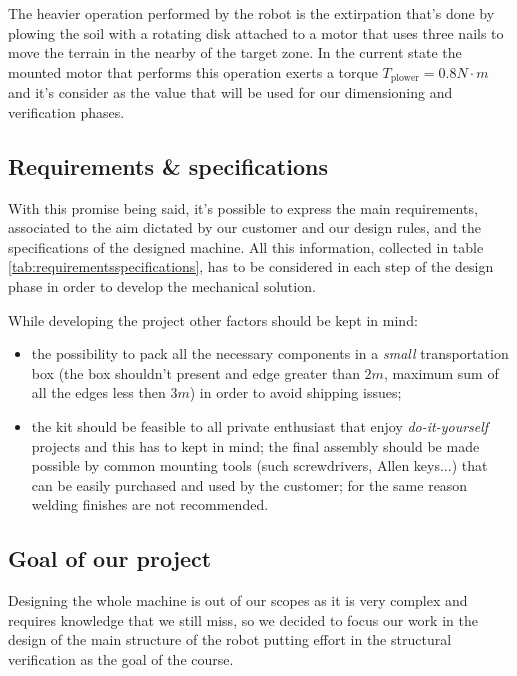 	The heavier operation performed by the robot is the extirpation that's done by plowing the soil with a rotating disk attached to a motor that uses three nails to move the terrain in the nearby of the target zone. In the current state the mounted motor that performs this operation exerts a torque $T_\textrm{plower} = 0.8 N\cdot m$ and it's consider as the value that will be used for our dimensioning and verification phases.

	
	\subsection{Requirements \& specifications}
		With this promise being said, it's possible to express the main requirements, associated to the aim dictated by our customer and our design rules, and the specifications of the designed machine. All this information, collected in table \ref{tab:requirementsspecifications}, has to be considered in each step of the design phase in order to develop the mechanical solution.
		
		
		
		While developing the project other factors should be kept in mind:
		\begin{itemize}
			\item the possibility to pack all the necessary components in a \textit{small} transportation box (the box shouldn't present and edge greater than $2m$, maximum sum of all the edges less then $3m$) in order to avoid shipping issues;
			
			\item the kit should be feasible to all private enthusiast that enjoy \textit{do-it-yourself} projects and this has to kept in mind; the final assembly should be made possible by common mounting tools (such screwdrivers, Allen keys...) that can be easily purchased and used by the customer; for the same reason welding finishes are not recommended.
		\end{itemize}
	
	\subsection{Goal of our project}
		Designing the whole machine is out of our scopes as it is very complex and requires knowledge that we still miss, so we decided to focus our work in the design of the main structure of the robot putting effort in the structural verification as the goal of the course.
	
	
	
	
	
	
	
	
	
	
	
	
	
	
	
	
	
	
	
	
	
	
	